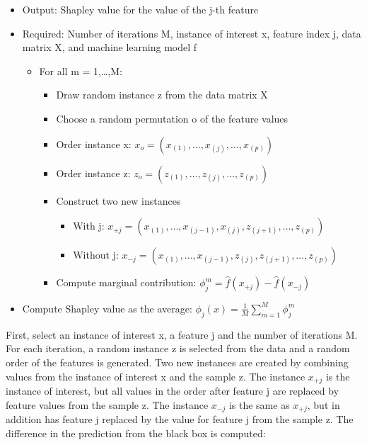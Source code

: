 \documentclass[
  12pt,
]{krantz}
\providecommand{\tightlist}{%
  \setlength{\itemsep}{0pt}\setlength{\parskip}{0pt}}
\begin{document}
\begin{itemize}
\tightlist
\item
  Output: Shapley value for the value of the j-th feature
\item
  Required: Number of iterations M, instance of interest x, feature index j, data matrix X, and machine learning model f

  \begin{itemize}
  \tightlist
  \item
    For all m = 1,\ldots,M:

    \begin{itemize}
    \tightlist
    \item
      Draw random instance z from the data matrix X
    \item
      Choose a random permutation o of the feature values
    \item
      Order instance x: \(x_o=(x_{(1)},\ldots,x_{(j)},\ldots,x_{(p)})\)
    \item
      Order instance z: \(z_o=(z_{(1)},\ldots,z_{(j)},\ldots,z_{(p)})\)
    \item
      Construct two new instances

      \begin{itemize}
      \tightlist
      \item
        With j: \(x_{+j}=(x_{(1)},\ldots,x_{(j-1)},x_{(j)},z_{(j+1)},\ldots,z_{(p)})\)
      \item
        Without j: \(x_{-j}=(x_{(1)},\ldots,x_{(j-1)},z_{(j)},z_{(j+1)},\ldots,z_{(p)})\)
      \end{itemize}
    \item
      Compute marginal contribution: \(\phi_j^{m}=\hat{f}(x_{+j})-\hat{f}(x_{-j})\)
    \end{itemize}
  \end{itemize}
\item
  Compute Shapley value as the average: \(\phi_j(x)=\frac{1}{M}\sum_{m=1}^M\phi_j^{m}\)
\end{itemize}

First, select an instance of interest x, a feature j and the number of iterations M.
For each iteration, a random instance z is selected from the data and a random order of the features is generated.
Two new instances are created by combining values from the instance of interest x and the sample z.
The instance \(x_{+j}\) is the instance of interest, but all values in the order after feature j are replaced by feature values from the sample z.
The instance \(x_{-j}\) is the same as \(x_{+j}\), but in addition has feature j replaced by the value for feature j from the sample z.
The difference in the prediction from the black box is computed:
\end{document}
